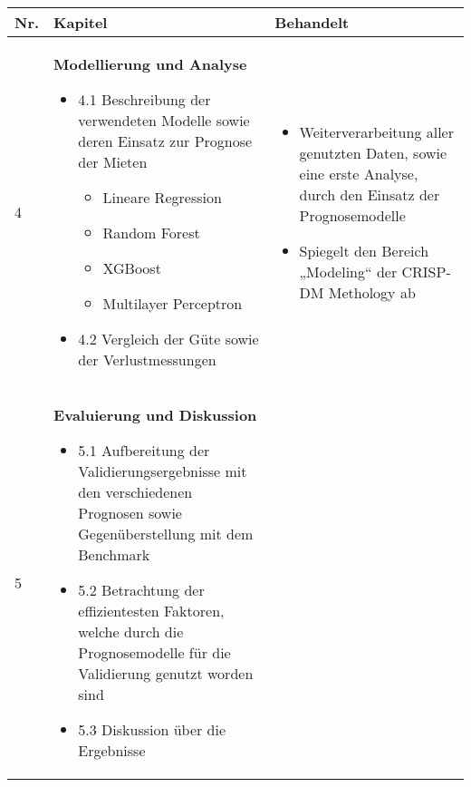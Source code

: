 \newpage
\begin{table}[H]
    \begin{tabularx}{\textwidth}[ht]{|l|X|X|}
      \hline
      \textbf{Nr.} & \textbf{Kapitel} & \textbf{Behandelt}\\
      \hline
      \hline
        4 & \textbf{Modellierung und Analyse} 
        
        \begin{itemize}
            \item 4.1 Beschreibung der verwendeten Modelle sowie deren Einsatz zur 
            Prognose der Mieten 
            \begin{itemize}
                \item Lineare Regression
                \item Random Forest
                \item XGBoost
                \item Multilayer Perceptron
            \end{itemize}
            \item 4.2 Vergleich der Güte sowie der Verlustmessungen
        \end{itemize}
        
        & \begin{itemize}
            \item Weiterverarbeitung aller genutzten Daten, sowie eine erste 
            Analyse, durch den Einsatz der Prognosemodelle
            \item Spiegelt den Bereich „Modeling“ der CRISP-DM Methology ab
        \end{itemize}\\
        \hline\hline
        5 & \textbf{Evaluierung und Diskussion} 
        
        \begin{itemize}
            \item 5.1 Aufbereitung der Validierungsergebnisse mit den verschiedenen 
            Prognosen sowie Gegenüberstellung mit dem Benchmark
            \item 5.2 Betrachtung der effizientesten Faktoren, welche durch die 
            Prognosemodelle für die Validierung genutzt worden sind
            \item 5.3 Diskussion über die Ergebnisse
        \end{itemize}


\end{tabularx}
\end{table}
